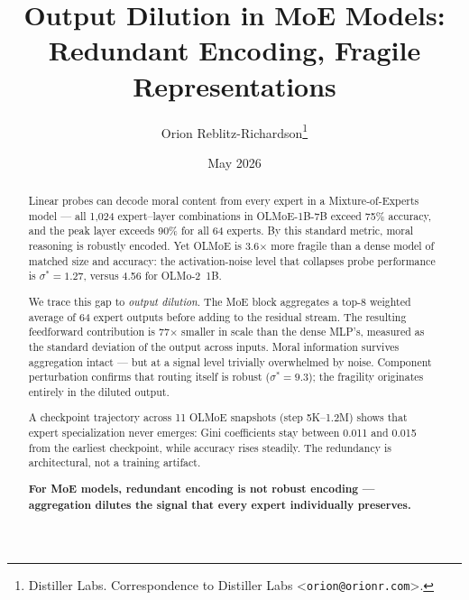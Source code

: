\documentclass{article}
\title{Output Dilution in MoE Models:\\
  Redundant Encoding, Fragile Representations}
\author{%
  Orion Reblitz-Richardson\thanks{%
    Distiller Labs. Correspondence to Distiller Labs
    \textless\texttt{orion@orionr.com}\textgreater.}
}
\date{May 2026}
\begin{document}
\maketitle

\begin{abstract}
Linear probes can decode moral content from every expert in a
Mixture-of-Experts model --- all 1,024 expert--layer combinations in
OLMoE-1B-7B exceed 75\% accuracy, and the peak layer exceeds 90\%
for all 64 experts. By this standard metric, moral reasoning is
robustly encoded. Yet OLMoE is 3.6$\times$ more fragile than a dense
model of matched size and accuracy: the activation-noise level that
collapses probe performance is $\sigma^* = 1.27$, versus 4.56 for
OLMo-2~1B.

We trace this gap to \emph{output dilution}. The MoE block aggregates
a top-8 weighted average of 64 expert outputs before adding to the
residual stream. The resulting feedforward contribution is
77$\times$ smaller in scale than the dense MLP's, measured as the
standard deviation of the output across inputs. Moral information
survives aggregation intact --- but at a signal level trivially
overwhelmed by noise. Component perturbation confirms that routing
itself is robust ($\sigma^* = 9.3$); the fragility originates
entirely in the diluted output.

A checkpoint trajectory across 11 OLMoE snapshots (step 5K--1.2M)
shows that expert specialization never emerges: Gini coefficients
stay between 0.011 and 0.015 from the earliest checkpoint, while
accuracy rises steadily. The redundancy is architectural, not a
training artifact.

\textbf{For MoE models, redundant encoding is not robust encoding ---
aggregation dilutes the signal that every expert individually
preserves.}
\end{abstract}







\end{document}
